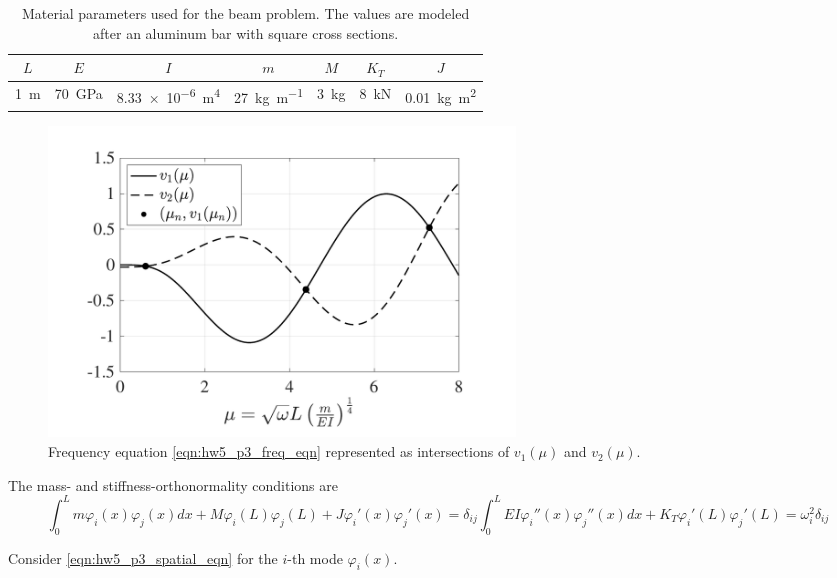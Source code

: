 \begin{enumerate}[(i)]
{\begin{enumerate}[(1)]
{\begin{table}
            \centering
            \begin{tabular}{|c|c|c|c|c|c|c|}
                \hline
                $L$ & $E$ & $I$ & $m$ & $M$ & $K_T$ & $J$ \\
                \hline
                \qty{1}{\m} & \qty{70}{\GPa} & \qty{8.33e-6}{\m^4} & \qty{27}{\kg\per\m} & \qty{3}{\kg} & \qty{8}{\kN} & \qty{0.01}{\kg\m\squared}  \\
                \hline
            \end{tabular}
            \caption{Material parameters used for the beam problem. The values are modeled after an aluminum bar with square cross sections.}\label{tab:hw5_p3_params}
        \end{table}
        \begin{figure}[!ht]
            \centering
            \includegraphics[width=0.6\textwidth]{homework/hw5/assets/hw5_p3_intersect.pdf}
            \caption{Frequency equation \cref{eqn:hw5_p3_freq_eqn} represented as intersections of $v_1(\mu)$ and $v_2(\mu)$.}\label{fig:hw5_p3_intersect}
        \end{figure}
    }
    \end{enumerate}
    The mass- and stiffness-orthonormality conditions are 
    \begin{subequations}
    \begin{equation}\label{eqn:hw5_p3_mass_orthonormality}
        \int_0^L m \varphi_i(x) \varphi_j(x) dx + M \varphi_i(L) \varphi_j(L) + J \varphi_i'(x) \varphi_j'(x) = \delta_{ij} 
    \end{equation}
    \begin{equation}\label{eqn:hw5_p3_stiffness_orthonormality}
        \int_0^L EI \varphi_i''(x) \varphi_j''(x) dx + K_T \varphi_i'(L) \varphi_j'(L) = \omega_i^2 \delta_{ij} 
    \end{equation}
    \end{subequations}
    \newpage
    \begin{prf}{}
        Consider \cref{eqn:hw5_p3_spatial_eqn} for the $i$-th mode $\varphi_i(x)$.

\end{prf}}
\end{enumerate}
